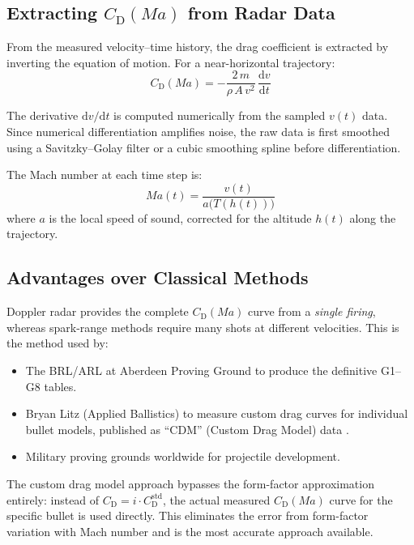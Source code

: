 \documentclass[11pt,twoside,openright]{report}
\newcommand{\dd}{\mathrm{d}}
\newcommand{\Cd}{C_{\mathrm{D}}}
\newcommand{\Mach}{\mathit{Ma}}
\begin{document}
\subsection{Extracting $\Cd(\Mach)$ from Radar Data}

From the measured velocity--time history, the drag coefficient is extracted by inverting the equation of motion. For a near-horizontal trajectory:
\begin{equation}
  \Cd(\Mach) = -\frac{2\,m}{\rho\,A\,v^2}\,\frac{\dd v}{\dd t}
  \label{eq:cd_from_radar}
\end{equation}

The derivative $\dd v/\dd t$ is computed numerically from the sampled $v(t)$ data. Since numerical differentiation amplifies noise, the raw data is first smoothed using a Savitzky--Golay filter or a cubic smoothing spline before differentiation.

The Mach number at each time step is:
\begin{equation}
  \Mach(t) = \frac{v(t)}{a\bigl(T(h(t))\bigr)}
  \label{eq:mach_from_radar}
\end{equation}
where $a$ is the local speed of sound, corrected for the altitude $h(t)$ along the trajectory.

\subsection{Advantages over Classical Methods}

Doppler radar provides the complete $\Cd(\Mach)$ curve from a \emph{single firing}, whereas spark-range methods require many shots at different velocities. This is the method used by:

\begin{itemize}[nosep]
  \item The BRL/ARL at Aberdeen Proving Ground to produce the definitive G1--G8 tables.
  \item Bryan Litz (Applied Ballistics) to measure custom drag curves for individual bullet models, published as ``CDM'' (Custom Drag Model) data \citep{litz2015ballistic}.
  \item Military proving grounds worldwide for projectile development.
\end{itemize}

The custom drag model approach bypasses the form-factor approximation entirely: instead of $\Cd = i \cdot \Cd^{\mathrm{std}}$, the actual measured $\Cd(\Mach)$ curve for the specific bullet is used directly. This eliminates the error from form-factor variation with Mach number and is the most accurate approach available.
\end{document}
